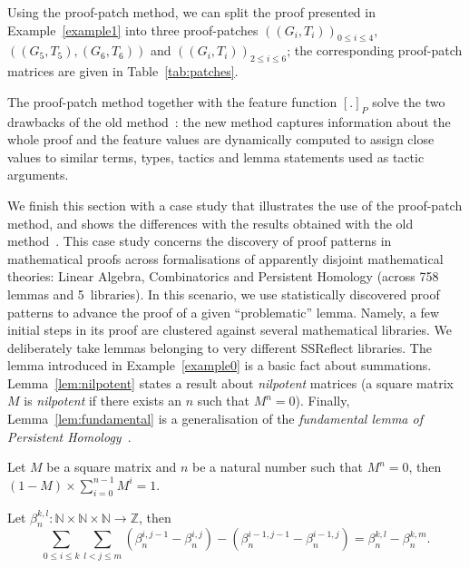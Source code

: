 \begin{example}
Using the proof-patch method, we  can split the proof presented in Example~\ref{example1} into three proof-patches $((G_i,T_i))_{0\leq i \leq 4}$,
$((G_5,T_5),(G_6,T_6))$ and $((G_i,T_i))_{2\leq i \leq 6}$; the corresponding proof-patch matrices are given in Table~\ref{tab:patches}.
\end{example}

The proof-patch method together with the feature function $[.]_P$ solve the two drawbacks of the old method~\cite{KHG13}:
the new method captures information about the whole proof and the feature values are dynamically computed to assign close
values to similar terms, types, tactics and lemma statements used as tactic arguments.


We finish this section with a case study that illustrates
the use of the proof-patch method, and shows the differences with the results obtained with the old method~\cite{KHG13}. This case study concerns the discovery of proof patterns in mathematical proofs
across formalisations of apparently disjoint mathematical theories: Linear Algebra, Combinatorics and Persistent Homology  (across 758 lemmas and 5~libraries).
In this scenario, we use statistically discovered proof patterns to advance the proof of a given ``problematic'' lemma.
Namely,  a few initial steps in its proof are clustered against several mathematical libraries.
We deliberately take lemmas belonging to very different SSReflect libraries. The lemma introduced in Example~\ref{example0} is a basic fact about
summations. Lemma~\ref{lem:nilpotent} states a result about \emph{nilpotent} matrices
(a square matrix $M$ is \emph{nilpotent}
if there exists an $n$ such that $M^n=0$). Finally, Lemma~\ref{lem:fundamental} is a generalisation of the \emph{fundamental lemma of
Persistent Homology}~\cite{HCMS12}.


\begin{lemma}\label{lem:nilpotent}
 Let $M$ be a square matrix and $n$ be a natural number such that $M^n=0$, then $(1-M)\times \sum\limits_{i=0}^{n-1} M^i = 1$.
\end{lemma}


\begin{lemma}\label{lem:fundamental}
Let $\beta_n^{k,l}:\mathbb{N} \times \mathbb{N} \times \mathbb{N} \rightarrow \mathbb{Z}$, then
$$\sum_{0\leq i \leq k} \sum_{l<j\leq m} (\beta_n^{i,j-1} - \beta_n^{i,j}) - (\beta_n^{i-1,j-1} - \beta_n^{i-1,j}) = \beta_n^{k,l} - \beta_n^{k,m}.$$
\end{lemma}



